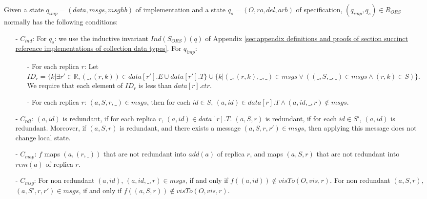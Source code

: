 Given a state $q_{\mathit{imp}} = (\mathit{data},\mathit{msgs},\mathit{msghb})$ of implementation and a state $q_s = (O,\mathit{ro},\mathit{del},\mathit{arb})$ of specification, $(q_{\mathit{imp}},q_s) \in R_{\mathit{ORS}}$ normally has the following conditions:

\begin{itemize}
\setlength{\itemsep}{0.5pt}
\item[-] $C_{\mathit{ind}}$: For $q_s$: we use the inductive invariant $\mathit{Ind}(S_{\mathit{ORS}})(q)$ of Appendix \ref{sec:appendix definitions and proofs of section succinct reference implementations of collection data types}. For $q_{\mathit{imp}}$:

    \begin{itemize}
    \setlength{\itemsep}{0.5pt}
    \item[-] For each replica $r$: Let $\mathit{ID}_r = \{ k \vert \exists r' \in \mathbb{R}, (\_,(r,k)) \in \mathit{data}[r'].E \cup \mathit{data}[r'].T \} \cup \{ k \vert (\_,(r,k),\_,\_) \in \mathit{msgs} \vee ( (\_,S,\_,\_) \in \mathit{msgs} \wedge (r,k) \in S ) \}$. We require that each element of $\mathit{ID}_r$ is less than $\mathit{data}[r].\mathit{ctr}$.

    \item[-] For each replica $r$: $(a,S,r,\_) \in \mathit{msgs}$, then for each $\mathit{id} \in S$, $(a,\mathit{id}) \in \mathit{data}[r].T \wedge (a,\mathit{id},\_,r) \notin \mathit{msgs}$.
    \end{itemize}

\item[-] $C_{\mathit{rdt}}$: $(a,\mathit{id})$ is redundant, if for each replica $r$, $(a,\mathit{id}) \in \mathit{data}[r].T$. $(a,S,r)$ is redundant, if for each $\mathit{id} \in S'$, $(a,\mathit{id})$ is redundant. Moreover, if $(a,S,r)$ is redundant, and there exists a message $(a,S,r,r') \in \mathit{msgs}$, then applying this message does not change local state.

\item[-] $C_{\mathit{map}}$: $f$ maps $(a,(r,\_))$ that are not redundant into $\mathit{add}(a)$ of replica $r$, and maps $(a,S,r)$ that are not redundant into $\mathit{rem}(a)$ of replica $r$.

\item[-] $C_{\mathit{msg}}$: For non redundant $(a,\mathit{id})$, $(a,\mathit{id},\_,r) \in \mathit{msgs}$, if and only if $f((a,\mathit{id})) \notin \mathit{visTo}(O,\mathit{vis},r)$. For non redundant $(a,S,r)$, $(a,S',r,r') \in \mathit{msgs}$, if and only if $f((a,S,r)) \notin \mathit{visTo}(O,\mathit{vis},r)$.


\end{itemize}

